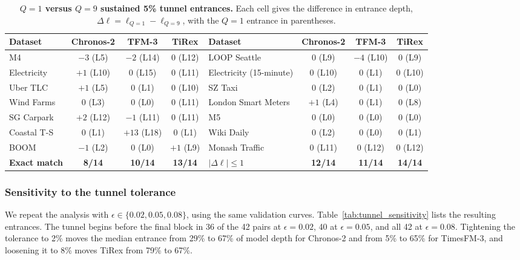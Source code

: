 \documentclass{article} %
\begin{document}
\begin{table}[t]
  \centering
  \caption{\textbf{$Q=1$ versus $Q=9$ sustained 5\% tunnel entrances.} Each cell gives the difference in entrance depth, $\Delta\ell=\ell_{Q=1}-\ell_{Q=9}$, with the $Q=1$ entrance in parentheses.}
  \vspace{4pt}
  \label{tab:q1_q9_comparison}
  \small
  \setlength{\tabcolsep}{3.5pt}
  \begin{tabular}{@{}lccc@{\qquad}lccc@{}}
  \toprule
  Dataset & Chronos-2 & TFM-3 & TiRex &
  Dataset & Chronos-2 & TFM-3 & TiRex \\
  \midrule
  M4 & $-3$ (L5) & $-2$ (L14) & 0 (L12) &
  LOOP Seattle & 0 (L9) & $-4$ (L10) & 0 (L9) \\
  Electricity & $+1$ (L10) & 0 (L15) & 0 (L11) &
  Electricity (15-minute) & 0 (L10) & 0 (L1) & 0 (L10) \\
  Uber TLC & $+1$ (L5) & 0 (L1) & 0 (L10) &
  SZ Taxi & 0 (L2) & 0 (L1) & 0 (L0) \\
  Wind Farms & 0 (L3) & 0 (L0) & 0 (L11) &
  London Smart Meters & $+1$ (L4) & 0 (L1) & 0 (L8) \\
  SG Carpark & $+2$ (L12) & $-1$ (L11) & 0 (L11) &
  M5 & 0 (L0) & 0 (L0) & 0 (L0) \\
  Coastal T-S & 0 (L1) & $+13$ (L18) & 0 (L1) &
  Wiki Daily & 0 (L2) & 0 (L0) & 0 (L1) \\
  BOOM & $-1$ (L2) & 0 (L0) & $+1$ (L9) &
  Monash Traffic & 0 (L11) & 0 (L12) & 0 (L12) \\
  \midrule
  \textbf{Exact match} & \textbf{8/14} & \textbf{10/14} & \textbf{13/14} &
  \textbf{$|\Delta\ell|\leq1$} & \textbf{12/14} & \textbf{11/14} & \textbf{14/14} \\
  \bottomrule
  \end{tabular}
\end{table}

\subsubsection{Sensitivity to the tunnel tolerance}
\label{sec:app_tunnel_sensitivity}

We repeat the analysis with $\epsilon\in\{0.02,0.05,0.08\}$, using the same validation curves. Table~\ref{tab:tunnel_sensitivity} lists the resulting entrances. The tunnel begins before the final block in 36 of the 42 pairs at $\epsilon=0.02$, 40 at $\epsilon=0.05$, and all 42 at $\epsilon=0.08$. Tightening the tolerance to 2\% moves the median entrance from 29\% to 67\% of model depth for Chronos-2 and from 5\% to 65\% for TimesFM-3, and loosening it to 8\% moves TiRex from 79\% to 67\%.
\end{document}
